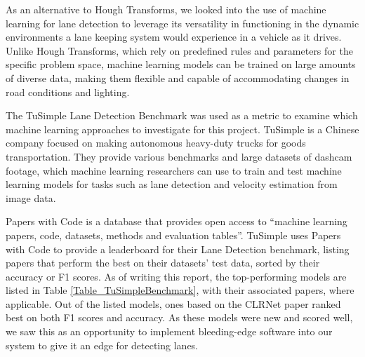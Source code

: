 \documentclass[titlepage,draft]{article}
\begin{document}
As an alternative to Hough Transforms, we looked into the use of machine learning for lane detection to leverage its versatility
in functioning in the dynamic environments a lane keeping system would experience in a vehicle as it drives.
Unlike Hough Transforms, which rely on predefined rules and parameters for the specific problem space, machine learning models
can be trained on large amounts of diverse data, making them flexible and capable of accommodating changes in road conditions
and lighting.

The TuSimple Lane Detection Benchmark\cite{TuSimpleBenchmark} was used as a metric to examine which machine learning approaches
to investigate for this project.
TuSimple is a Chinese company focused on making autonomous heavy-duty trucks for goods transportation.
They provide various benchmarks and large datasets of dashcam footage, which machine learning researchers can use to train and
test machine learning models for tasks such as lane detection and velocity estimation from image data. \cite{TuSimpleBenchmark}

Papers with Code is a database that provides open access to ``machine learning papers, code, datasets, methods and evaluation
tables''. \cite{PapersWithCode}
TuSimple uses Papers with Code to provide a leaderboard for their Lane Detection benchmark, listing papers that perform the best
on their datasets' test data, sorted by their accuracy or F1 scores.
As of writing this report, the top-performing models are listed in Table \ref{Table_TuSimpleBenchmark}, with their associated
papers, where applicable.
Out of the listed models, ones based on the CLRNet paper ranked best on both F1 scores and accuracy.
As these models were new and scored well, we saw this as an opportunity to implement bleeding-edge software into our system
to give it an edge for detecting lanes.
\end{document}
